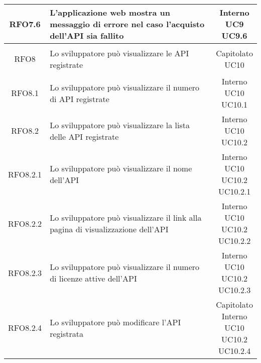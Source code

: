 \begin{longtable}{|c|p{8cm}|c|}
\hypertarget{RFO7.6}{RFO7.6} & L'applicazione web mostra un messaggio di errore nel caso l'acquisto dell'API sia fallito & \makecell*{Interno\\UC9\\UC9.6} \\
\hline

\hypertarget{RFO8}{RFO8} & Lo sviluppatore può visualizzare le API registrate & \makecell*{Capitolato\\UC10} \\
\hline

\hypertarget{RFO8.1}{RFO8.1} & Lo sviluppatore può visualizzare il numero di API registrate & \makecell*{Interno\\UC10\\UC10.1} \\
\hline

\hypertarget{RFO8.2}{RFO8.2} & Lo sviluppatore può visualizzare la lista delle API registrate & \makecell*{Interno\\UC10\\UC10.2} \\
\hline
\hypertarget{RFO8.2.1}{RFO8.2.1} & Lo sviluppatore può visualizzare il nome dell'API & \makecell*{Interno\\UC10\\UC10.2\\UC10.2.1} \\
\hline
\hypertarget{RFO8.2.2}{RFO8.2.2} & Lo sviluppatore può visualizzare il link alla pagina di visualizzazione dell'API & \makecell*{Interno\\UC10\\UC10.2\\UC10.2.2} \\
\hline
\hypertarget{RFO8.2.3}{RFO8.2.3} & Lo sviluppatore può visualizzare il numero di licenze attive dell'API & \makecell*{Interno\\UC10\\UC10.2\\UC10.2.3} \\
\hline

\hypertarget{RFO8.2.4}{RFO8.2.4} & Lo sviluppatore può modificare l'API registrata & \makecell*{Capitolato\\Interno\\UC10\\UC10.2\\UC10.2.4} \\
\hline


\end{longtable}
